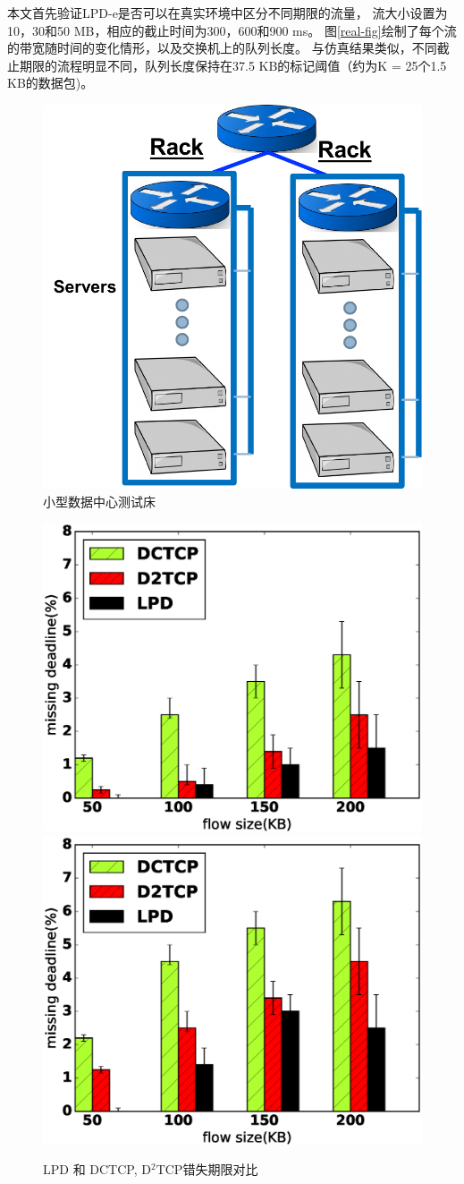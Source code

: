 本文首先验证LPD-e是否可以在真实环境中区分不同期限的流量，
流大小设置为10，30和50 MB，相应的截止时间为300，600和900 ms。
图\ref{real-fig}绘制了每个流的带宽随时间的变化情形，以及交换机上的队列长度。
与仿真结果类似，不同截止期限的流程明显不同，队列长度保持在37.5 KB的标记阈值（约为K = 25个1.5 KB的数据包)。

\begin{figure}[H] 
  \centering
  \includegraphics[width=0.5\columnwidth]{figures/LPD/realtopology.pdf}
  \caption{小型数据中心测试床}
\label{testbed-fig}
\end{figure}


\begin{figure}[h]
\centering
{}
 {\includegraphics[width=0.45\columnwidth]{figures/LPD/Realtest/miss_deadline_1.eps}}
{\includegraphics[width=0.45\columnwidth]{figures/LPD/Realtest/miss_deadline_2.eps}}
\caption{LPD 和 DCTCP, D$^2$TCP错失期限对比}
\label{testbed-deadlinemiss-fig}
\end{figure}




